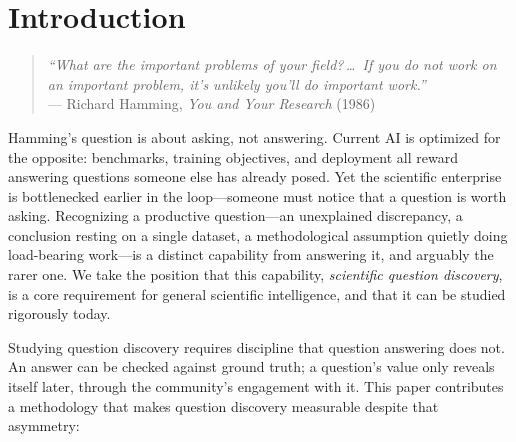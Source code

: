 \section{Introduction}
\label{sec:introduction}

\begin{quote}
\emph{``What are the important problems of your field?\,\ldots\ If you do
not work on an important problem, it's unlikely you'll do important
work.''}\\
\hspace*{\fill}--- Richard Hamming, \emph{You and Your Research} (1986)
\end{quote}

Hamming's question is about asking, not answering. Current AI is
optimized for the opposite: benchmarks, training objectives, and
deployment all reward answering questions someone else has already
posed. Yet the scientific enterprise is bottlenecked earlier in the
loop---someone must notice that a question is worth asking. Recognizing
a productive question---an unexplained discrepancy, a conclusion resting
on a single dataset, a methodological assumption quietly doing
load-bearing work---is a distinct capability from answering it, and
arguably the rarer one. We take the position that this capability,
\emph{scientific question discovery}, is a core requirement for general
scientific intelligence, and that it can be studied rigorously today.

Studying question discovery requires discipline that question answering
does not. An answer can be checked against ground truth; a question's
value only reveals itself later, through the community's engagement with
it. This paper contributes a methodology that makes question discovery
measurable despite that asymmetry:


